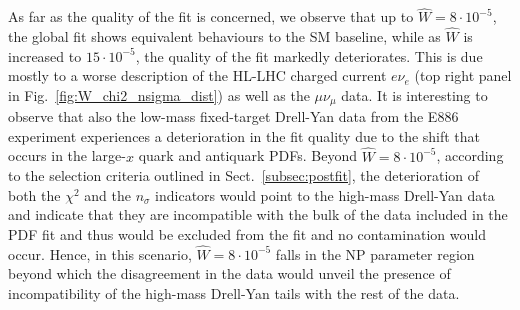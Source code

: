 \documentclass[withindex,glossary]{cam-thesis}
\begin{document}
As far as the quality of the fit is concerned, we observe that
up to $\hat{W}=8\cdot 10^{-5}$, the global fit shows
    equivalent behaviours to the SM baseline, while as $\hat{W}$ is increased to
    $15\cdot 10^{-5}$, the quality of the fit markedly deteriorates. This is due
    mostly to a worse description of the HL-LHC charged current
    $e\nu_{e}$ (top right panel in Fig.~\ref{fig:W_chi2_nsigma_dist}) as
    well as the $\mu\nu_\mu$ data. It is interesting to observe that
    also the low-mass fixed-target Drell-Yan data from the E886
    experiment experiences a deterioration in the fit quality due to
    the shift that occurs in the large-$x$ quark and antiquark PDFs. 
    Beyond $\hat{W}=8\cdot 10^{-5}$, according to the selection criteria outlined in
    Sect.~\ref{subsec:postfit}, the deterioration of both the $\chi^2$ and the $n_{\sigma}$ indicators
    would point to the high-mass Drell-Yan data and indicate that they
    are incompatible with the bulk of the data included in the PDF fit
    and thus would be excluded from the fit and no contamination would occur. 
    Hence, in this scenario, $\hat{W}=8\cdot10^{-5}$ falls in the NP parameter region 
    beyond which the disagreement in
    the data would unveil the presence of incompatibility of the high-mass Drell-Yan
    tails with the rest of the data.  
\end{document}
